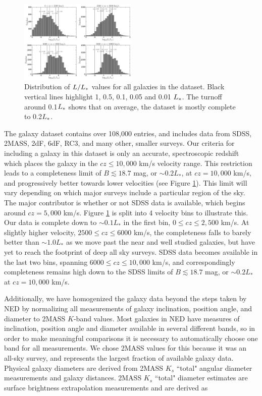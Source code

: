\documentclass[iop]{emulateapj-rtx4}
\begin{document}
\begin{figure}[ht!]
        \centering
        \vspace{0pt}
        \includegraphics[width=0.50\textwidth]{Lstar_histogram_4bins_final_0-10000_v2.pdf}
        \caption{\small{Distribution of $L/L_{\**}$ values for all galaxies in the dataset. Black vertical lines highlight 1, 0.5, 0.1, 0.05 and 0.01 $L_{\**}$. The turnoff around 0.1$L_{\**}$ shows that on average, the dataset is mostly complete to 0.2$L_{\**}$.}}
        \label{completeness}
\end{figure} 

The galaxy dataset contains over 108,000 entries, and includes data from SDSS, 2MASS, 2dF, 6dF, RC3, and many other, smaller surveys. Our criteria for including a galaxy in this dataset is only an accurate, spectroscopic redshift which places the galaxy in the $cz \leq 10,000$ km/s velocity range. This restriction leads to a completeness limit of $B \lesssim 18.7$ mag, or $\sim0.2 L_*$, at $cz = 10,000$ km/s, and progressively better towards lower velocities (see Figure \ref{completeness}). This limit will vary depending on which major surveys include a particular region of the sky. The major contributor is whether or not SDSS data is available, which begins around $cz = 5,000$ km/s. Figure \ref{completeness} is split into 4 velocity bins to illustrate this. Our data is complete down to $\sim0.1 L_*$ in the first bin, $0 \leq cz \leq 2,500$ km/s. At slightly higher velocity, $2500 \leq cz \leq 6000$ km/s, the completeness falls to barely better than $\sim1.0 L_*$ as we move past the near and well studied galaxies, but have yet to reach the footprint of deep all sky surveys. SDSS data becomes available in the last two bins, spanning $6000 \leq cz \leq 10,000$ km/s, and correspondingly completeness remains high down to the SDSS limits of $B \lesssim 18.7$ mag, or $\sim0.2 L_*$ at $cz = 10,000$ km/s.


Additionally, we have homogenized the galaxy data beyond the steps taken by NED by normalizing all measurements of galaxy inclination, position angle, and diameter to 2MASS $K$-band values. Most galaxies in NED have measures of inclination, position angle and diameter available in several different bands, so in order to make meaningful comparisons it is necessary to automatically choose one band for all measurements. We chose 2MASS values for this because it was an all-sky survey, and represents the largest fraction of available galaxy data. Physical galaxy diameters are derived from 2MASS $K_s$ ``total" angular diameter measurements and galaxy distances. 2MASS $K_s$ ``total" diameter estimates are surface brightness extrapolation measurements and are derived as 
\end{document}
